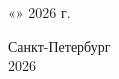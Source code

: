 \vspace{0.2cm}

\begin{flushright}
    \large
    «\underline{\hspace{1cm}}» \underline{\hspace{3cm}} 2026 г.
\end{flushright}

\vspace{0.6cm}

\begin{center}
    Санкт-Петербург \\
    2026
\end{center}

\clearpage 
